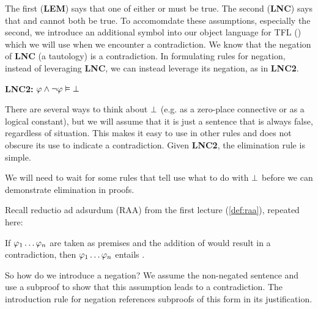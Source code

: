 The first (\textbf{LEM}) says that one of either \ephi or \enot\ephi must be
true. The second (\textbf{LNC}) says that \ephi and \enot\ephi cannot both be
true. To accomomdate these assumptions, especially the second, we introduce an
additional symbol into our object language for TFL (\ebot) which we will use
when we encounter a contradiction. We know that the negation of \textbf{LNC}
(a tautology) is a contradiction. In formulating rules for negation, instead of
leveraging \textbf{LNC}, we can instead leverage its negation, as in
\textbf{LNC2}.

\begin{center}
    \textbf{LNC2:} $\varphi\wedge\neg\varphi\vDash\bot$
\end{center}

There are several ways to think about $\bot$ (e.g. as a zero-place connective
or as a logical constant), but we will assume that it is just a sentence that is
always false, regardless of situation. This makes it easy to use in other rules
and does not obscure its use to indicate a contradiction. Given \textbf{LNC2},
the elimination rule is simple.

\begin{fitchrule}
  \label{def:not-elimination-rule}
  \leavevmode
  \vspace{-0.9\baselineskip}
  \begin{fitchproof}
     {\enot\ephi}
     {\ephi}
     {\ebot}      
  \end{fitchproof}
\end{fitchrule}

We will need to wait for some rules that tell use what to do with $\bot$ before
we can demonstrate \enot elimination in proofs.

Recall reductio ad adsurdum (RAA) from the first lecture (\ref{def:raa}),
repeated here:

\begin{definition}
  \label{def:raa-repeated}
  If $\varphi_1\dots\varphi_n$ are taken as premises and the addition of \spsi would
  result in a contradiction, then $\varphi_1\dots\varphi_n$ entails \enot\epsi.
\end{definition}

So how do we introduce a negation? We assume the non-negated sentence and use
a subproof to show that this assumption leads to a contradiction. The
introduction rule for negation references subproofs of this form in its
justification.


